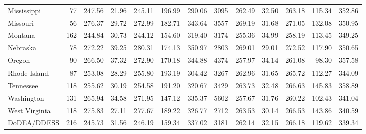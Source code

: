 \begin{sidewaystable}[ht]
{\begin{tabular}{lrrrrrr@{\extracolsep{10pt}}rrrrrr}
  Mississippi &  77 & 247.56 & 21.96 & 245.11 & 196.99 & 290.06 & 3095 & 262.49 & 32.50 & 263.18 & 115.34 & 352.86 \\ 
  Missouri &  56 & 276.37 & 29.72 & 272.99 & 182.71 & 343.64 & 3557 & 269.19 & 31.68 & 271.05 & 132.08 & 350.95 \\ 
  Montana & 162 & 244.84 & 30.73 & 244.12 & 154.60 & 319.40 & 3174 & 255.36 & 34.99 & 258.19 & 113.45 & 349.25 \\ 
  Nebraska &  78 & 272.22 & 39.25 & 280.31 & 174.13 & 350.97 & 2803 & 269.01 & 29.01 & 272.52 & 117.90 & 350.65 \\ 
  Oregon &  90 & 266.50 & 37.32 & 272.90 & 170.18 & 344.88 & 4374 & 257.97 & 34.14 & 261.08 & 98.30 & 357.58 \\ 
  Rhode Island &  87 & 253.08 & 28.29 & 255.80 & 193.19 & 304.42 & 3267 & 262.96 & 31.65 & 265.72 & 112.27 & 344.09 \\ 
  Tennessee & 118 & 255.62 & 30.19 & 254.58 & 191.20 & 320.67 & 3429 & 263.73 & 32.48 & 266.63 & 145.83 & 358.89 \\ 
  Washington & 131 & 265.94 & 34.58 & 271.95 & 147.12 & 335.37 & 5602 & 257.67 & 31.76 & 260.22 & 102.43 & 341.04 \\ 
  West Virginia & 118 & 275.83 & 27.11 & 277.67 & 189.22 & 326.77 & 2712 & 263.53 & 30.14 & 266.53 & 143.86 & 340.59 \\ 
  DoDEA/DDESS & 216 & 245.73 & 31.56 & 246.19 & 159.34 & 337.02 & 3181 & 262.14 & 32.15 & 266.18 & 119.62 & 339.34 \\ 
   \hline
\end{tabular}}
\end{sidewaystable}
